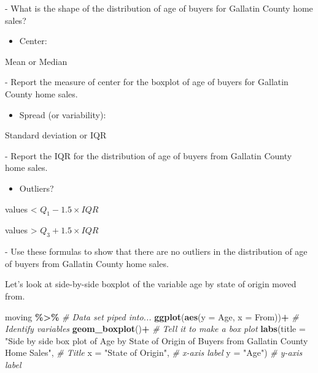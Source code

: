 \documentclass[
]{report}
\newenvironment{Shaded}{\begin{snugshade}}{\end{snugshade}}
\newcommand{\AttributeTok}[1]{\textcolor[rgb]{0.13,0.29,0.53}{#1}}
\newcommand{\CommentTok}[1]{\textcolor[rgb]{0.56,0.35,0.01}{\textit{#1}}}
\newcommand{\FunctionTok}[1]{\textcolor[rgb]{0.13,0.29,0.53}{\textbf{#1}}}
\newcommand{\NormalTok}[1]{#1}
\newcommand{\SpecialCharTok}[1]{\textcolor[rgb]{0.81,0.36,0.00}{\textbf{#1}}}
\newcommand{\StringTok}[1]{\textcolor[rgb]{0.31,0.60,0.02}{#1}}
\providecommand{\tightlist}{%
  \setlength{\itemsep}{0pt}\setlength{\parskip}{0pt}}
\newcommand{\rgi}{\hspace{24pt}}  %
\begin{document}
\rgi \rgi - What is the shape of the distribution of age of buyers for Gallatin County home sales?

\vspace{0.3in}

\begin{itemize}
\tightlist
\item
  Center:
\end{itemize}

\rgi Mean or Median

\rgi \rgi - Report the measure of center for the boxplot of age of buyers for Gallatin County home sales.

\vspace{0.3in}

\begin{itemize}
\tightlist
\item
  Spread (or variability):
\end{itemize}

\rgi Standard deviation or IQR

\rgi \rgi - Report the IQR for the distribution of age of buyers from Gallatin County home sales.

\vspace{0.3in}

\begin{itemize}
\tightlist
\item
  Outliers?
\end{itemize}

\rgi values \textless{} \(Q_1 - 1.5 \times IQR\)

\rgi values \textgreater{} \(Q_3 + 1.5 \times IQR\)

\rgi \rgi - Use these formulas to show that there are no outliers in the distribution of age of buyers from Gallatin County home sales.

\vspace{0.8in}
\newpage

Let's look at side-by-side boxplot of the variable age by state of origin moved from.

\begin{Shaded}
\begin{Highlighting}[]
\NormalTok{moving }\SpecialCharTok{\%\textgreater{}\%}  \CommentTok{\# Data set piped into...}
  \FunctionTok{ggplot}\NormalTok{(}\FunctionTok{aes}\NormalTok{(}\AttributeTok{y =}\NormalTok{ Age, }\AttributeTok{x =}\NormalTok{ From))}\SpecialCharTok{+}  \CommentTok{\# Identify variables}
  \FunctionTok{geom\_boxplot}\NormalTok{()}\SpecialCharTok{+}  \CommentTok{\# Tell it to make a box plot}
  \FunctionTok{labs}\NormalTok{(}\AttributeTok{title =} \StringTok{"Side by side box plot of Age by State of Origin }
\StringTok{  of Buyers from Gallatin County Home Sales"}\NormalTok{,  }\CommentTok{\# Title}
       \AttributeTok{x =} \StringTok{"State of Origin"}\NormalTok{,    }\CommentTok{\# x{-}axis label}
       \AttributeTok{y =} \StringTok{"Age"}\NormalTok{)  }\CommentTok{\# y{-}axis label}
\end{Highlighting}
\end{Shaded}
\end{document}
